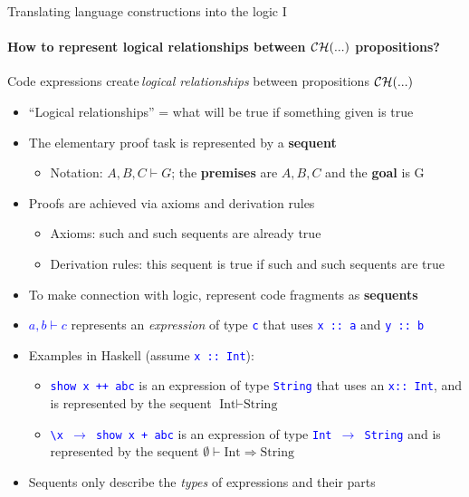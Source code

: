 \documentclass[english]{beamer}
\begin{document}
\begin{frame}{Translating language constructions into the logic I}


\framesubtitle{How to represent logical relationships between ${\cal CH}(...)$
propositions?}

Code expressions create\,\emph{logical relationships} between propositions
${\cal CH}(...)$
\begin{itemize}
\item ``Logical relationships'' = what will be true if something given
is true
\item The elementary proof task is represented by a \textbf{sequent}
\begin{itemize}
\item Notation: $A,B,C\vdash G$; the \textbf{premises} are $A,B,C$ and
the \textbf{goal} is G
\end{itemize}
\item Proofs are achieved via axioms and derivation rules
\begin{itemize}
\item Axioms: such and such sequents are already true
\item Derivation rules: this sequent is true if such and such sequents are
true
\end{itemize}
\item To make connection with logic, represent code fragments as \textbf{sequents}
\item \textcolor{blue}{$a,b\vdash c$} represents an \emph{expression} of
type \texttt{\textcolor{blue}{\footnotesize{}c}} that uses \texttt{\textcolor{blue}{\footnotesize{}x
::\ a}} and \texttt{\textcolor{blue}{\footnotesize{}y ::\ b}}{\footnotesize \par}
\item Examples in Haskell (assume \texttt{\textcolor{blue}{\footnotesize{}x
::\ Int}}):
\begin{itemize}
\item \texttt{\textcolor{blue}{\footnotesize{}show x ++ \textquotedbl{}abc\textquotedbl{}}}
is an expression of type \texttt{\textcolor{blue}{\footnotesize{}String}}
that uses an \texttt{\textcolor{blue}{\footnotesize{}x::\ Int}},
and is represented by the sequent $\text{Int}\vdash\text{String}$
\item \texttt{\textcolor{blue}{\footnotesize{}\textbackslash{}x $\rightarrow$
show x + \textquotedbl{}abc\textquotedbl{}}} is an expression of type
\texttt{\textcolor{blue}{\footnotesize{}Int $\rightarrow$ String}}
and is represented by the sequent $\emptyset\vdash\text{Int}\Rightarrow\text{String}$
\end{itemize}
\item Sequents only describe the \emph{types} of expressions and their parts
\end{itemize}
\end{frame}
\end{document}
